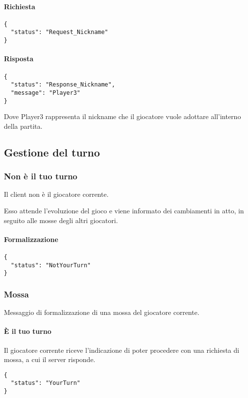 \documentclass[a4paper,11pt]{article} %
\begin{document}
    \paragraph{Richiesta}
    \begin{verbatim}
{
  "status": "Request_Nickname"
}
    \end{verbatim}

    \paragraph{Risposta}
    \begin{verbatim}
{
  "status": "Response_Nickname",
  "message": "Player3"
}
    \end{verbatim}
    Dove \textsf{Player3} rappresenta il nickname che il giocatore vuole adottare all'interno della partita.

    \subsection{Gestione del turno}\label{subsec:gestione-del-turno}

    \subsubsection{Non è il tuo turno}
    Il client non è il giocatore corrente.

    Esso attende l'evoluzione del gioco e viene informato dei cambiamenti in atto, in seguito alle mosse degli altri giocatori.

    \paragraph{Formalizzazione}
    \begin{verbatim}
{
  "status": "NotYourTurn"
}
    \end{verbatim}

    \subsubsection{Mossa}
    Messaggio di formalizzazione di una mossa del giocatore corrente.

    \paragraph{È il tuo turno}
    Il giocatore corrente riceve l'indicazione di poter procedere con una richiesta di mossa, a cui il server risponde.
    \begin{verbatim}
{
  "status": "YourTurn"
}
    \end{verbatim}
\end{document}
